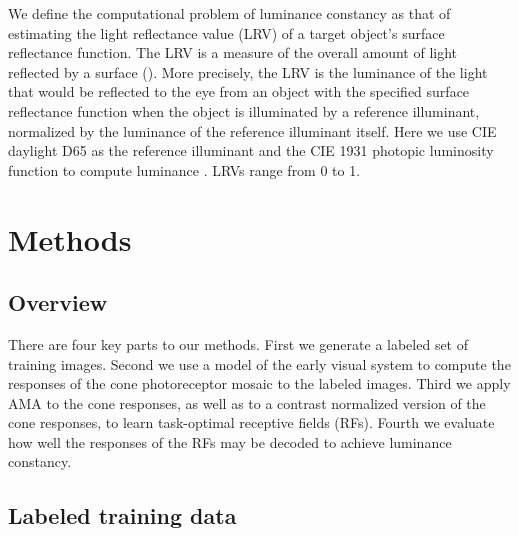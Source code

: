 \documentclass{jov}
\begin{document}
We define the computational problem of luminance constancy as that of estimating the light reflectance value (LRV) of a target object's surface reflectance function.
The LRV is a measure of the overall amount of light reflected by a surface (\citeauthor{astm1121477}).
More precisely, the LRV is the luminance of the light that would be reflected to the eye from an object with the 
specified surface reflectance function when the object is illuminated by a reference illuminant,
normalized by the luminance of the reference illuminant itself.
Here we use CIE daylight D65 as the reference illuminant and the CIE 1931 photopic luminosity function to compute luminance \cite{CIE86}.
LRVs range from 0 to 1.

\section*{Methods} \label{Methods}
\subsection{Overview}
There are four key parts to our methods.  First we generate a labeled set of training images.  Second we use a model of the early visual system to compute the responses of the cone photoreceptor mosaic to the labeled images. Third we apply AMA to the cone responses, as well as to a contrast normalized version of the cone responses, to learn task-optimal receptive fields (RFs). Fourth we evaluate how well the responses of the RFs may be decoded to achieve luminance constancy.

\subsection{Labeled training data} \label{method:VirtualWorld}
\end{document}
